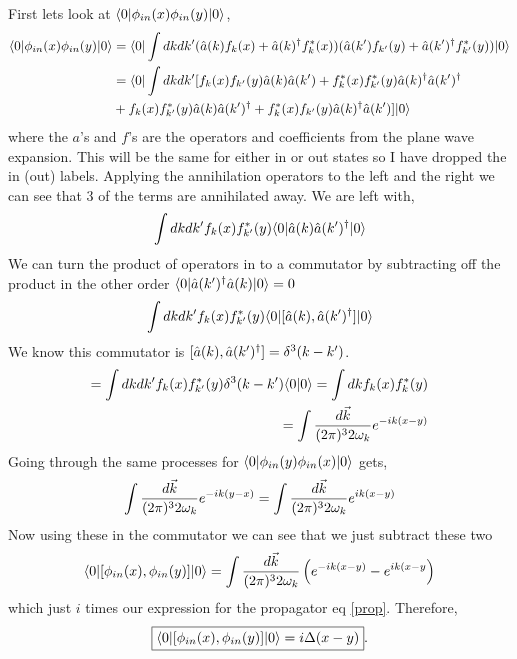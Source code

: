 \documentclass{article}
\numberwithin{equation}{section}
\newcommand{\beq}[1]{\begin{equation} \begin{aligned} #1 \end{aligned} \end{equation}}
\newcommand{\bkt}[2]{\langle #1| #2  \rangle}
\newcommand{\brkt}[3]{\langle #1 | #2 | #3 \rangle}
\begin{document}
First lets look at $\brkt{0}{ \phinx \phiny }{0}$,
\beq{
    \brkt{0}{\phinx \phiny}{0} &= \brkt{0}{\int dk dk' (\ak f_k(x) + \akd f_k^*(x) )( \akp f_{k'}(y) + \akpd f_{k'}^*(y)   ) }{0} \\
    &= \brkt{0}{\int dk dk'   
    [ f_k(x) f_{k'}(y) \ak \akp + f_k^*(x) f_{k'}^*(y) \akd \akpd \\
     &    + f_k(x) f_{k'}^*(y) \ak \akpd + f_k^*(x) f_{k'}(y) \akd \akp ]
    }{0}
} 
where the $a$'s and $f$'s are the operators and coefficients from the plane wave expansion. This will be the same for either in or out states so I have dropped the in (out) labels. Applying the annihilation operators to the left and the right we can see that 3 of the terms are annihilated away. We are left with,
\beq{
    \int dk dk' f_k(x) f_{k'}^*(y) \brkt{0}{\ak \akpd}{0}
}
We can turn the product of operators in to a commutator by subtracting off the product in the other order $ \brkt{0}{\akpd \ak}{0} = 0$
\beq{
    \int dk dk' f_k(x) f_{k'}^*(y) \brkt{0}{[\ak, \akpd]}{0}
}
We know this commutator is $[\hat{a}(k), \hat{a}(k')^{\dagger}] = \delta^3(k-k')$.
\beq{
    =\int dk dk' f_k(x) f_{k'}^*(y) \delta^3(k-k') \bkt{0}{0} = \int dk f_k(x) f_k^*(y) \\
    = \intk e^{-ik(x-y)}
}
Going through the same processes for $\brkt{0}{\phiny \phinx}{0}$ gets,
\beq{
    \intk e^{-ik(y-x)} = \intk e^{ik(x-y)}
}
Now using these in the commutator we can see that we just subtract these two
\beq{
    \brkt{0}{[\phinx, \phiny]}{0} = \intk \left( e^{-ik(x-y)} - e^{ik(x-y} \right)
}
which just $i$ times our expression for the propagator eq \ref{prop}. Therefore,
\beq{
    \boxed{\brkt{0}{[\phinx, \phiny]}{0} = i \Delta(x-y) }.
}
\end{document}
